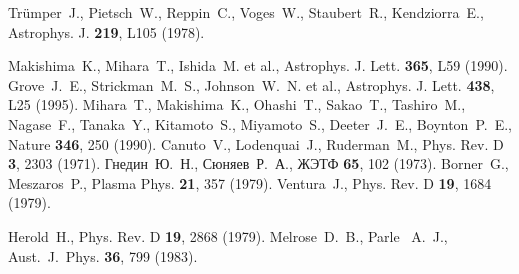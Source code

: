 \documentclass[cp1251%
               ]{jetp} %
\begin{document}

\begin{references}
%
 Tr\"{u}mper~J., Pietsch~W., Reppin~C., Voges~W., Staubert~R., Kendziorra~E., Astrophys. J. {\bf 219}, L105 (1978).
  
%
  Makishima~K., Mihara~T., Ishida~M. et al., Astrophys. J. Lett. {\bf 365}, L59 (1990).
%
  Grove~J.~E., Strickman~M.~S., Johnson~W.~N. et al., Astrophys. J. Lett. {\bf 438}, L25 (1995).
%
  Mihara~T., Makishima~K., Ohashi~T., Sakao~T., Tashiro~M., Nagase~F., Tanaka~Y., Kitamoto~S., Miyamoto~S., Deeter~J.~E., 
  Boynton~P.~E., Nature {\bf 346}, 250 (1990).
%
Canuto~V., Lodenquai~J., Ruderman~M., Phys. Rev. D {\bf 3}, 2303 (1971).
%
    Гнедин~Ю.~Н., Сюняев~Р.~А., ЖЭТФ {\bf 65}, 102 (1973).
%
  Borner~G., Meszaros~P., Plasma Phys. {\bf 21}, 357 (1979).
%
  Ventura~J., Phys. Rev. D {\bf 19}, 1684 (1979).

%
   Herold~H., Phys. Rev. D {\bf 19}, 2868 (1979).
%
  Melrose~D.~B., Parle~ A.~J.,
   Aust.~J.~Phys. {\bf 36}, 799 (1983).


\end{references}
\end{document}
